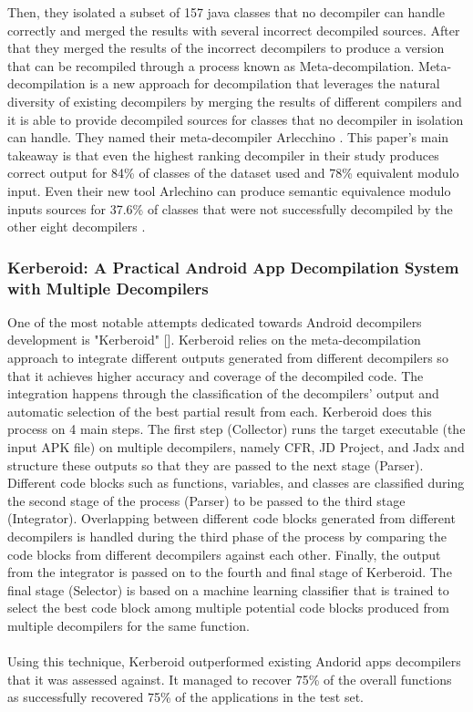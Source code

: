 \documentclass{article}
\begin{document}
Then, they isolated a subset of 157 java classes that no decompiler can handle correctly and merged the results with several incorrect decompiled sources.
After that they merged the results of the incorrect decompilers to produce a version that can be recompiled through a process known as Meta-decompilation. Meta-decompilation is a new approach for decompilation that leverages the natural diversity of existing decompilers by merging the results of different compilers and it is able to provide decompiled sources for classes that no decompiler in isolation can handle. They named their meta-decompiler Arlecchino \cite{harrand_java_2020}.
This paper’s main takeaway is that even the highest ranking decompiler in their study produces correct output for 84\% of classes of the dataset used and 78\% equivalent modulo input. Even their new tool Arlechino can produce semantic equivalence modulo inputs sources for 37.6\% of classes that were not successfully decompiled by the other eight decompilers \cite{harrand_java_2020}.
\subsubsection{Kerberoid: A Practical Android App Decompilation System with Multiple Decompilers}
One of the most notable attempts dedicated towards Android decompilers development is "Kerberoid" []. Kerberoid relies on the meta-decompilation approach to integrate different outputs generated from different decompilers so that it achieves higher accuracy and coverage of the decompiled code. The integration happens through the classification of the decompilers' output and automatic selection of the best partial result from each. Kerberoid does this process on 4 main steps. The first step (Collector) runs the target executable (the input APK file) on multiple decompilers, namely CFR, JD Project, and Jadx and structure these outputs so that they are passed to the next stage (Parser). Different code blocks such as functions, variables, and classes are classified during the second stage of the process (Parser) to be passed to the third stage (Integrator). Overlapping between different code blocks generated from different decompilers is handled during the third phase of the process by comparing the code blocks from different decompilers against each other. Finally, the output from the integrator is passed on to the fourth and final stage of Kerberoid. The final stage (Selector) is based on a machine learning classifier that is trained to select the best code block among multiple potential code blocks produced from multiple decompilers for the same function.\\\\
Using this technique, Kerberoid outperformed existing Andorid apps decompilers that it was assessed against. It managed to recover 75\% of the overall functions as successfully recovered 75\% of the applications in the test set.
\end{document}
